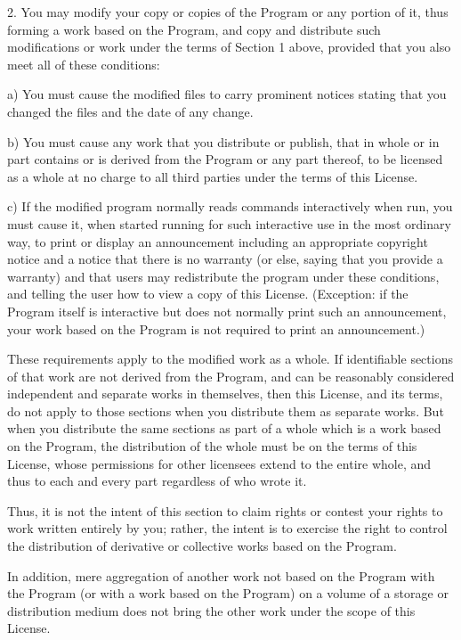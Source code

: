 \begin{small}
2. You may modify your copy or copies of the Program or any portion of it,
thus forming a work based on the Program, and copy and distribute such
modifications or work under the terms of Section 1 above, provided that you
also meet all of these conditions:

    a) You must cause the modified files to carry prominent notices stating
that you changed the files and the date of any change. 

    b) You must cause any work that you distribute or publish, that in whole
or in part contains or is derived from the Program or any part thereof, to be
licensed as a whole at no charge to all third parties under the terms of this
License. 

    c) If the modified program normally reads commands interactively when run,
you must cause it, when started running for such interactive use in the most
ordinary way, to print or display an announcement including an appropriate
copyright notice and a notice that there is no warranty (or else, saying that
you provide a warranty) and that users may redistribute the program under
these conditions, and telling the user how to view a copy of this License.
(Exception: if the Program itself is interactive but does not normally print
such an announcement, your work based on the Program is not required to print
an announcement.) 

These requirements apply to the modified work as a whole. If identifiable
sections of that work are not derived from the Program, and can be reasonably
considered independent and separate works in themselves, then this License,
and its terms, do not apply to those sections when you distribute them as
separate works. But when you distribute the same sections as part of a whole
which is a work based on the Program, the distribution of the whole must be on
the terms of this License, whose permissions for other licensees extend to the
entire whole, and thus to each and every part regardless of who wrote it.

Thus, it is not the intent of this section to claim rights or contest your
rights to work written entirely by you; rather, the intent is to exercise the
right to control the distribution of derivative or collective works based on
the Program.

In addition, mere aggregation of another work not based on the Program with
the Program (or with a work based on the Program) on a volume of a storage or
distribution medium does not bring the other work under the scope of this
License.


\end{small}
